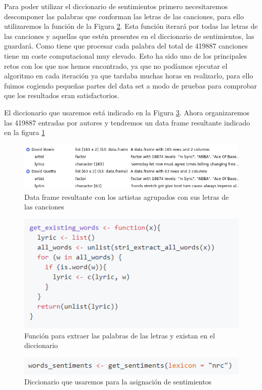 Para poder utilizar el diccionario de sentimientos primero necesitaremos descomponer las palabras que conforman las letras de las canciones, para ello utilizaremos la función de la Figura \ref{fig:get_existing_words}. Esta función iterará por todas las letras de las canciones y aquellas que estén presentes en el diccionario de sentimientos, las guardará. Como tiene que procesar cada palabra del total de 419887 canciones tiene un coste computacional muy elevado. Esto ha sido uno de los principales retos con los que nos hemos encontrado, ya que no podíamos ejecutar el algoritmo en cada iteración ya que tardaba muchas horas en realizarlo, para ello fuimos cogiendo pequeñas partes del data set a modo de pruebas para comprobar que los resultados eran satisfactorios.

El diccionario que usaremos está indicado en la Figura \ref{fig:word_sentiments}. Ahora organizaremos las 419887 entradas por autores y tendremos un data frame resultante indicado en la figura \ref{fig:artistlyrics-dataframe}

\begin{figure}[h]
	\centering
	\includegraphics[width=0.7\linewidth]{Imagenes/artistlyrics-dataframe}
	\caption{Data frame resultante con los artistas agrupados con sus letras de las canciones}
	\label{fig:artistlyrics-dataframe}
\end{figure}

\begin{figure}[h]
	\centering
	\includegraphics[width=0.7\linewidth]{Imagenes/get_existing_words}
	\caption{Función para extraer las palabras de las letras y existan en el diccionario }
	\label{fig:get_existing_words}
\end{figure}

\begin{figure}[h]
	\centering
	\includegraphics[width=0.7\linewidth]{Imagenes/word_sentiments}
	\caption{Diccionario que usaremos para la asignación de sentimientos}
	\label{fig:word_sentiments}
\end{figure}


